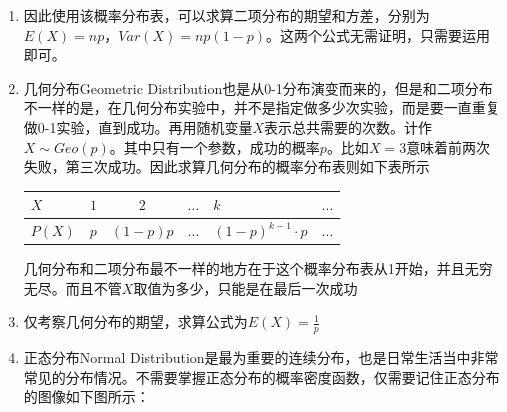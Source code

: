 \begin{enumerate}
\item 因此使用该概率分布表，可以求算二项分布的期望和方差，分别为$E(X)=np$，$Var(X)=np(1-p)$。这两个公式\textcolor{r1}{无需证明}，只需要运用即可。

\item 几何分布Geometric Distribution也是从0-1分布演变而来的，但是和二项分布不一样的是，在几何分布实验中，并不是指定做多少次实验，而是要\textcolor{r1}{一直重复做0-1实验，直到成功}。再用随机变量$X$表示总共需要的次数。计作$X\sim Geo(p)$。其中只有一个\textcolor{r1}{参数，成功的概率$p$}。比如$X=3$意味着前两次失败，第三次成功。因此求算几何分布的概率分布表则如下表所示

\begin{table}[H]
\centering
\begin{tabular}{|l|c|c|c|l|l|}
\hline
$X$    & $1$ & $2$      & $\ldots$ & $k$              & $\ldots$ \\ \hline
$P(X)$ & $p$ & $(1-p)p$ & $\ldots$ & $(1-p)^{k-1}\cdot p$ & $\ldots$ \\ \hline
\end{tabular}
\end{table}

几何分布和二项分布最不一样的地方在于这个概率分布表\textcolor{r1}{从1开始，并且无穷无尽}。而且不管$X$取值为多少，只能是在最后一次成功

\item 仅考察几何分布的\textcolor{r1}{期望}，求算公式为$E(X)=\frac{1}{p}$

\item 正态分布Normal Distribution是最为重要的\textcolor{r1}{连续}分布，也是日常生活当中非常常见的分布情况。不需要掌握正态分布的概率密度函数，仅需要记住正态分布的\textcolor{r1}{图像}如下图所示：



\end{enumerate}

